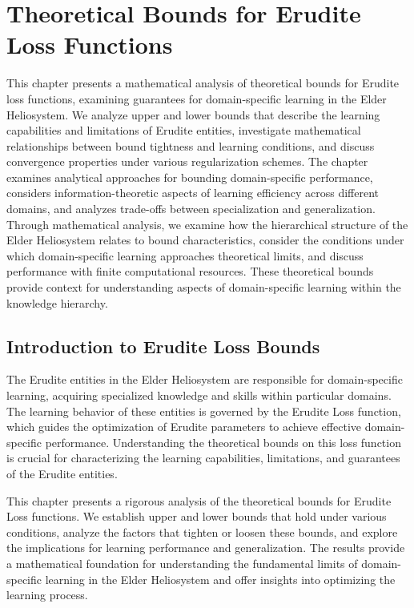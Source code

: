 \chapter{Theoretical Bounds for Erudite Loss Functions}

\begin{tcolorbox}[colback=blue!5!white,colframe=blue!75!black,title=Chapter Summary]
This chapter presents a mathematical analysis of theoretical bounds for Erudite loss functions, examining guarantees for domain-specific learning in the Elder Heliosystem. We analyze upper and lower bounds that describe the learning capabilities and limitations of Erudite entities, investigate mathematical relationships between bound tightness and learning conditions, and discuss convergence properties under various regularization schemes. The chapter examines analytical approaches for bounding domain-specific performance, considers information-theoretic aspects of learning efficiency across different domains, and analyzes trade-offs between specialization and generalization. Through mathematical analysis, we examine how the hierarchical structure of the Elder Heliosystem relates to bound characteristics, consider the conditions under which domain-specific learning approaches theoretical limits, and discuss performance with finite computational resources. These theoretical bounds provide context for understanding aspects of domain-specific learning within the knowledge hierarchy.
\end{tcolorbox}

\section{Introduction to Erudite Loss Bounds}

The Erudite entities in the Elder Heliosystem are responsible for domain-specific learning, acquiring specialized knowledge and skills within particular domains. The learning behavior of these entities is governed by the Erudite Loss function, which guides the optimization of Erudite parameters to achieve effective domain-specific performance. Understanding the theoretical bounds on this loss function is crucial for characterizing the learning capabilities, limitations, and guarantees of the Erudite entities.

This chapter presents a rigorous analysis of the theoretical bounds for Erudite Loss functions. We establish upper and lower bounds that hold under various conditions, analyze the factors that tighten or loosen these bounds, and explore the implications for learning performance and generalization. The results provide a mathematical foundation for understanding the fundamental limits of domain-specific learning in the Elder Heliosystem and offer insights into optimizing the learning process.

